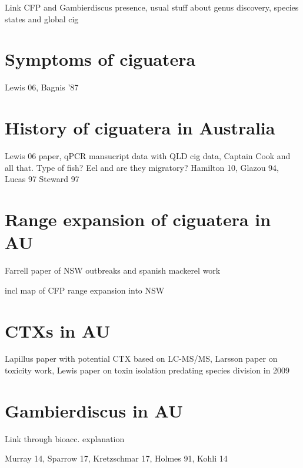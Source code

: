 \documentclass[12pt]{article}
\begin{document}
Link CFP and Gambierdiscus presence, usual stuff about genus discovery, species states and global cig

\section*{Symptoms of ciguatera}
Lewis 06, Bagnis '87

\section*{History of ciguatera in Australia}
Lewis 06 paper, qPCR mansucript data with QLD cig data, Captain Cook and all that. Type of fish? Eel and are they migratory?
Hamilton 10, Glazou 94, Lucas 97 Steward 97

\section*{Range expansion of ciguatera in AU}
Farrell paper of NSW outbreaks and spanish mackerel work

incl map of CFP range expansion into NSW

\section*{CTXs in AU}
Lapillus paper with potential CTX based on LC-MS/MS, Larsson paper on toxicity work, Lewis paper on toxin isolation predating species division in 2009


\section*{Gambierdiscus in AU}
Link through bioacc. explanation 

Murray 14, Sparrow 17, Kretzschmar 17, Holmes 91, Kohli 14



\newpage


\end{document}
